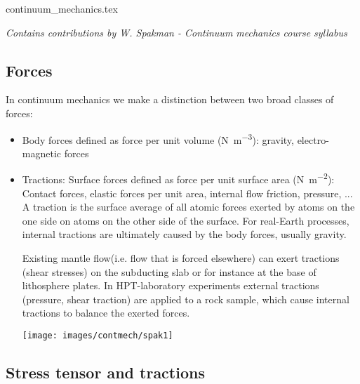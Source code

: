 \begin{flushright} {\tiny {\color{gray} continuum\_mechanics.tex}} \end{flushright}

{\sl Contains contributions by W. Spakman - Continuum mechanics course syllabus} 

\subsection{Forces}

In continuum mechanics we make a distinction between two broad classes of forces:
\begin{itemize}
\item Body forces defined as force per unit volume (\si{\newton\per\cubic\metre}): 
gravity, electro-magnetic forces
\item Tractions: Surface forces defined as force per unit surface area (\si{\newton\per\square\metre}):
Contact forces, elastic forces per unit area, internal flow friction, pressure, ...\\
A traction is the surface average of all atomic forces exerted by
atoms on the one side on atoms on the other side of the surface.
For real-Earth processes, internal tractions are ultimately caused by
the body forces, usually gravity.


Existing mantle flow(i.e. flow that is forced elsewhere) can exert
tractions (shear stresses) on the subducting slab or for instance at
the base of lithosphere plates.
In HPT-laboratory experiments external tractions (pressure, shear
traction) are applied to a rock sample, which cause internal
tractions to balance the exerted forces.

\begin{center}
\texttt{[image: images/contmech/spak1]}
\end{center}
\end{itemize}

\subsection{Stress tensor and tractions}\label{sec:stresstensor}

